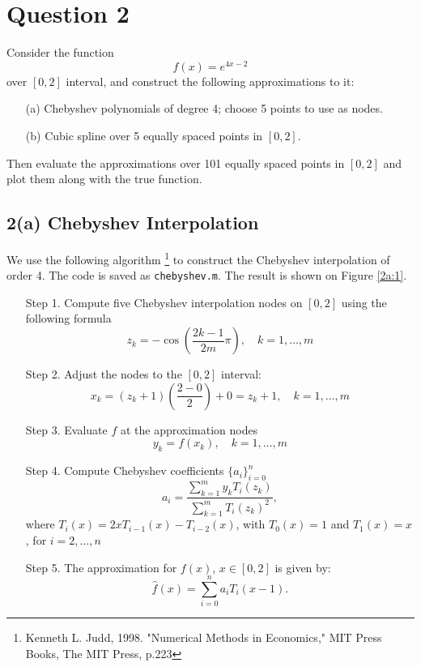 \documentclass[11pt]{article}
\newcommand{\1}{\mathbbm{1}}
\newcounter{daggerfootnote}
\newcommand*{\daggerfootnote}[1]{%
	\setcounter{daggerfootnote}{\value{footnote}}%
	\renewcommand*{\thefootnote}{\fnsymbol{footnote}}%
	\footnote[2]{#1}%
	\setcounter{footnote}{\value{daggerfootnote}}%
	\renewcommand*{\thefootnote}{\arabic{footnote}}%
}
\begin{document}
\section*{Question 2}
Consider the function 
\[f (x ) = e^{4x-2} \]
over $[0,2]$ interval, and construct the following approximations
to it:
\begin{enumerate}
	\item[(a)] Chebyshev polynomials of degree 4; choose 5 points to use as nodes.
	\item[(b)] Cubic spline over 5 equally spaced points in $[0,2]$.
\end{enumerate}
Then evaluate the approximations over 101 equally spaced points in $[0,2]$ and plot them along with the true function. 

\subsection*{2(a) Chebyshev Interpolation}
We use the following algorithm\daggerfootnote{Kenneth L. Judd, 1998. "Numerical Methods in Economics," MIT Press Books, The MIT Press, p.223} to construct the Chebyshev interpolation of order 4. The code is saved as \texttt{chebyshev.m}. The result is shown on Figure \ref{2a:1}.
\begin{enumerate}
	\item [Step 1.] Compute five Chebyshev interpolation nodes on $[0,2]$ using the following formula
	\[z_k = -\cos\left(\frac{2k-1}{2m}\pi\right), \quad k=1,\ldots,m\]
	\item[Step 2.] Adjust the nodes to the $[0,2]$ interval:
	\[x_k=(z_k+1)\left(\frac{2-0}{2}\right)+0=z_k+1,\quad k=1,\ldots,m\]
	\item[Step 3.] Evaluate $f$ at the approximation nodes
	\[y_k=f(x_k), \quad k=1,\ldots,m\]
	\item[Step 4.] Compute Chebyshev coefficients $\{a_i\}_{i=0}^n$
	\[a_i=\frac{\sum_{k=1}^my_kT_i(z_k)}{\sum_{k=1}^mT_i(z_k)^2},\]
	where $T_i(x)=2xT_{i-1}(x)-T_{i-2}(x)$, with $T_0(x)=1$ and $T_1(x)=x$, for $i=2,\ldots,n$
	\item[Step 5.] The approximation for $f(x)$, $x\in[0,2]$ is given by:
	\[\hat{f}(x)=\sum_{i=0}^n a_iT_i\left(x-1\right).\]
\end{enumerate}
\end{document}
